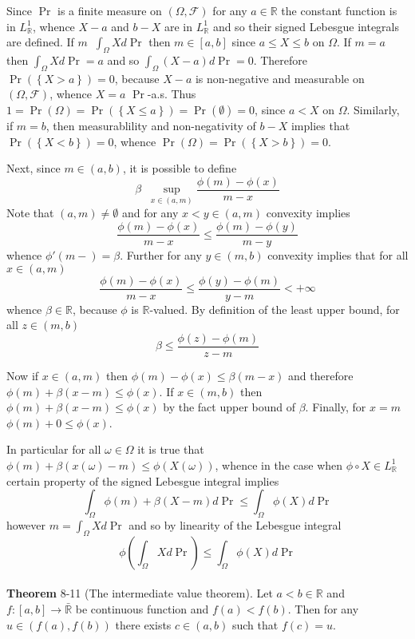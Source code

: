 \documentclass[a4paper]{article}
\newcommand{\obj}[1]{\left\{ #1 \right \}}
\newcommand{\clo}[1]{\left [ #1 \right ]}
\newcommand{\brac}[1]{\left ( #1 \right )}
\newcommand{\Rbar}{{\bar{\mathbb{R}}}}
\newcommand{\Real}{\mathbb{R}}
\newcommand{\Fcal}{\mathcal{F}}
\newcommand{\defn}{\mathop{\overset{\Delta}{=}}\nolimits}
\begin{document}
Since $\Pr$ is a finite measure on $\brac{\Omega, \Fcal}$ for any $a\in \Real$ the constant function is in $L^1_\Real$, whence $X-a$ and $b-X$ are in $L^1_\Real$ and so their signed Lebesgue integrals are defined. If $m\defn \int_\Omega X d\Pr$ then $m\in \clo{a,b}$ since $a\leq X\leq b$ on $\Omega$. If $m=a$ then $\int_\Omega X d\Pr = a$ and so $\int_\Omega \brac{X - a} d\Pr = 0$. Therefore $\Pr\brac{\obj{X>a}} = 0$, because $X-a$ is non-negative  and measurable on $\brac{\Omega, \Fcal}$, whence $X=a$ $\Pr$-a.s. Thus $1 = \Pr\brac{\Omega} = \Pr\brac{\obj{X\leq a}} = \Pr\brac{\emptyset} = 0$, since $a<X$ on $\Omega$. Similarly, if $m=b$, then measurablility and non-negativity of $b-X$ implies that $\Pr\brac{\obj{X<b}} = 0$, whence $\Pr\brac{\Omega} = \Pr\brac{\obj{X>b}} = 0$.

Next, since $m\in \brac{a,b}$, it is possible to define \[\beta\defn \sup_{x\in \brac{a,m}}\frac{\phi\brac{m}-\phi\brac{x}}{m-x}\] Note that $\brac{a,m} \neq \emptyset$ and for any $x<y\in \brac{a,m}$ convexity implies \[\frac{\phi\brac{m}-\phi\brac{x}}{m-x}\leq \frac{\phi\brac{m}-\phi\brac{y}}{m-y}\] whence $\phi'\brac{m-}=\beta$. Further for any $y\in \brac{m, b}$ convexity implies that for all $x\in \brac{a,m}$ \[\frac{\phi\brac{m}-\phi\brac{x}}{m-x}\leq \frac{\phi\brac{y}-\phi\brac{m}}{y-m}<+\infty\] whence $\beta\in \Real$, because $\phi$ is $\Real$-valued. By definition of the least upper bound, for all $z\in \brac{m,b}$ \[\beta \leq \frac{\phi\brac{z}-\phi\brac{m}}{z-m} \]

Now if $x\in \brac{a,m}$ then $\phi\brac{m}-\phi\brac{x}\leq \beta\brac{m-x}$ and therefore $\phi\brac{m} + \beta\brac{x-m}\leq\phi\brac{x}$. If $x\in \brac{m,b}$ then $\phi\brac{m}+\beta\brac{x-m}\leq \phi\brac{x}$ by the fact upper bound of $\beta$. Finally, for $x=m$ $\phi\brac{m}+0\leq \phi\brac{x}$.

In particular for all $\omega\in \Omega$ it is true that $\phi\brac{m} + \beta\brac{ x\brac{\omega} - m}\leq \phi\brac{X\brac{\omega}}$, whence in the case when $\phi\circ X\in L^1_\Real$ certain property of the signed Lebesgue integral implies \[\int_\Omega \phi\brac{m} + \beta \brac{X-m} d\Pr \leq \int_\Omega \phi\brac{X} d\Pr\] however $m=\int_\Omega X d\Pr$ and so by linearity of the Lebesgue	integral \[ \phi\brac{\int_\Omega X d\Pr}\leq \int_\Omega \phi\brac{X} d\Pr\]\\

\label{thm:cont_ivt} \noindent \textbf{Theorem} 8-11 (The intermediate value theorem).
Let $a<b\in \Real$ and $f:\clo{a,b}\to \Rbar$ be continuous function and $f\brac{a}<f\brac{b}$. Then for any $u\in \brac{f\brac{a}, f\brac{b}}$ there exists $c\in \brac{a,b}$ such that $f\brac{c} = u$.
\end{document}
